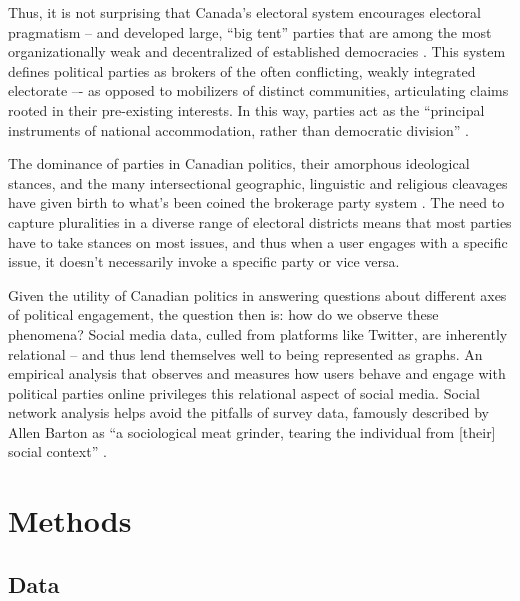 \documentclass{nws}
\begin{document}
Thus, it is not surprising that Canada’s electoral system
encourages electoral pragmatism – and developed large, ``big tent'' parties that
are among the most organizationally weak and decentralized of established
democracies \cite{carty2010political}. This system defines political parties as brokers of the often
conflicting, weakly integrated electorate –- as opposed to mobilizers of
distinct communities, articulating claims rooted in their pre-existing
interests. In this way, parties act as the ``principal instruments of national
accommodation, rather than democratic division'' \cite{carty2010political}.

The dominance of parties in Canadian politics, their amorphous ideological
stances, and the many intersectional geographic, linguistic and religious
cleavages have given birth to what’s been coined the brokerage party system
\cite{carty2010political}. The need to capture pluralities in a diverse range of
electoral districts means that most parties have to take stances on most issues,
and thus when a user engages with a specific issue, it doesn’t necessarily
invoke a specific party or vice versa. 

Given the utility of Canadian politics in answering questions about different
axes of political engagement, the question then is: how do we observe these
phenomena? Social media data, culled from platforms like Twitter, are inherently
relational -- and thus lend themselves well to being represented as graphs. An
empirical analysis that observes and measures how users behave and engage with
political parties online privileges this relational aspect of social media.
Social network analysis helps avoid the pitfalls of survey data, famously
described by Allen Barton as “a sociological meat grinder, tearing the
individual from [their] social context” \cite{freeman2004development}.  


\section{Methods}

\subsection{Data}
\end{document}
